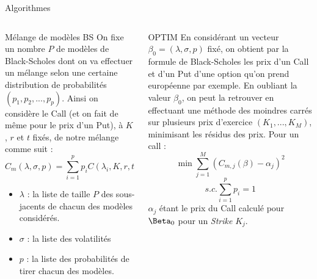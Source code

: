 \documentclass[final]{beamer}
\newlength{\onecolwid}
\newlength{\twocolwid}
\begin{document}
\begin{frame}[t]
\begin{columns}[t]
\begin{column}{\twocolwid}
\begin{alertblock}{Algorithmes}
\begin{columns}[t,totalwidth=0.45\paperwidth] %

\begin{column}{\onecolwid} %

\begin{block}{Mélange de modèles BS}
  On fixe un nombre $P$ de modèles de Black-Scholes dont on va effectuer un mélange selon une certaine distribution de probabilités $(p_1,p_2,...,p_p)$.
  \newline
  Ainsi on considère le Call (et on fait de même pour le prix d'un Put), à $K$, $r$ et $t$ fixés, de notre mélange comme suit :
  $$ C_m(\lambda, \sigma, p) = \sum^p_{i=1} p_i C(\lambda_i,K,r,t,\sigma_i) $$
\begin{itemize}
  \item $\lambda$ : la liste de taille $P$ des sous-jacents de chacun des modèles considérés.
  \item $\sigma$ : la liste des volatilités
  \item $p$ : la liste des probabilités de tirer chacun des modèles.
\end{itemize}
\end{block}


\end{column} %

\begin{column}{\onecolwid} %


\begin{block}{OPTIM}
    En considérant un vecteur $ \beta_0 = (\lambda,\sigma,p)$ fixé, on obtient par la formule de Black-Scholes les prix d'un Call et d'un Put d'une option qu'on prend européenne par exemple.
    \newline
    En oubliant la valeur $\beta_0$, on peut la retrouver en effectuant une méthode des moindres carrés sur plusieurs prix d'exercice $(K_1,...,K_M)$, minimisant les résidus des prix. Pour un call :
    $$ \min \sum^M_{j=1} (C_{m,j}(\beta)-\alpha_j)^2 $$
    \vspace{-0.3cm}
    $$ s.c. \sum^p_{i=1}p_i = 1 $$
  $\alpha_j$ étant le prix du Call calculé pour $\Beta_0$ pour un \textit{Strike} $K_j$.
\end{block}


\end{column}
\end{columns}
\end{alertblock}
\end{column}
\end{columns}
\end{frame}
\end{document}
